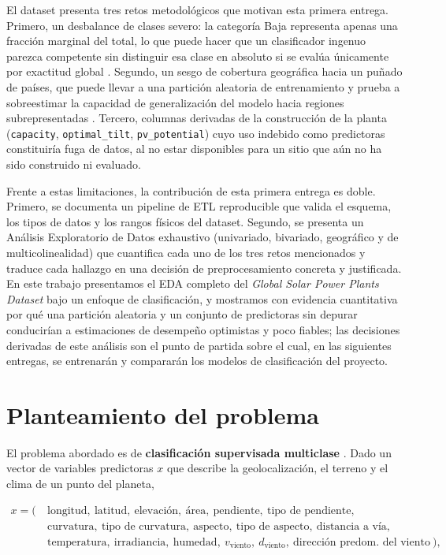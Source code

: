 \documentclass[pdflatex,sn-mathphys-num]{sn-jnl}
\begin{document}
El dataset presenta tres retos metodológicos que motivan esta primera entrega. Primero, un desbalance de clases severo: la categoría Baja representa apenas una fracción marginal del total, lo que puede hacer que un clasificador ingenuo parezca competente sin distinguir esa clase en absoluto si se evalúa únicamente por exactitud global \cite{bib3}. Segundo, un sesgo de cobertura geográfica hacia un puñado de países, que puede llevar a una partición aleatoria de entrenamiento y prueba a sobreestimar la capacidad de generalización del modelo hacia regiones subrepresentadas \cite{bib2}. Tercero, columnas derivadas de la construcción de la planta (\texttt{capacity}, \texttt{optimal\_tilt}, \texttt{pv\_potential}) cuyo uso indebido como predictoras constituiría fuga de datos, al no estar disponibles para un sitio que aún no ha sido construido ni evaluado.

Frente a estas limitaciones, la contribución de esta primera entrega es doble. Primero, se documenta un pipeline de ETL reproducible que valida el esquema, los tipos de datos y los rangos físicos del dataset. Segundo, se presenta un Análisis Exploratorio de Datos exhaustivo (univariado, bivariado, geográfico y de multicolinealidad) que cuantifica cada uno de los tres retos mencionados y traduce cada hallazgo en una decisión de preprocesamiento concreta y justificada. En este trabajo presentamos el EDA completo del \textit{Global Solar Power Plants Dataset} bajo un enfoque de clasificación, y mostramos con evidencia cuantitativa por qué una partición aleatoria y un conjunto de predictoras sin depurar conducirían a estimaciones de desempeño optimistas y poco fiables; las decisiones derivadas de este análisis son el punto de partida sobre el cual, en las siguientes entregas, se entrenarán y compararán los modelos de clasificación del proyecto.

\section{Planteamiento del problema}\label{sec:planteamiento}

El problema abordado es de \textbf{clasificación supervisada multiclase} \cite{bib3}. Dado un vector de variables predictoras $x$ que describe la geolocalización, el terreno y el clima de un punto del planeta,

\begin{equation}
\begin{split}
x = \big(\ &\text{longitud},\ \text{latitud},\ \text{elevación},\ \text{área},\ \text{pendiente},\ \text{tipo de pendiente},\\
&\text{curvatura},\ \text{tipo de curvatura},\ \text{aspecto},\ \text{tipo de aspecto},\ \text{distancia a vía},\\
&\text{temperatura},\ \text{irradiancia},\ \text{humedad},\ v_{\text{viento}},\ d_{\text{viento}},\ \text{dirección predom. del viento}\ \big),
\end{split}
\label{eq:features}
\end{equation}
\end{document}
